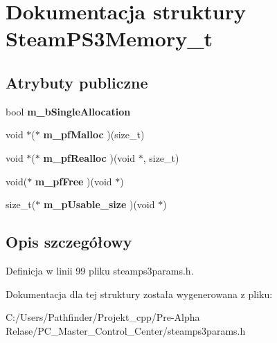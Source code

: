 \hypertarget{struct_steam_p_s3_memory__t}{}\section{Dokumentacja struktury Steam\+P\+S3\+Memory\+\_\+t}
\label{struct_steam_p_s3_memory__t}
\subsection*{Atrybuty publiczne}
\begin{DoxyCompactItemize}
\item 
\mbox{\label{struct_steam_p_s3_memory__t_a44b907c77800a95cbd721db75b0dbb55}} 
bool {\bfseries m\+\_\+b\+Single\+Allocation}
\item 
\mbox{\label{struct_steam_p_s3_memory__t_af1b7ebb45f7c058b9d45cc4aa1b21b13}} 
void $\ast$($\ast$ {\bfseries m\+\_\+pf\+Malloc} )(size\+\_\+t)
\item 
\mbox{\label{struct_steam_p_s3_memory__t_a0d84a4228b5424ffe007bec26faa0b94}} 
void $\ast$($\ast$ {\bfseries m\+\_\+pf\+Realloc} )(void $\ast$, size\+\_\+t)
\item 
\mbox{\label{struct_steam_p_s3_memory__t_a2a2933267637e0e85ccb09e1ae3ce93b}} 
void($\ast$ {\bfseries m\+\_\+pf\+Free} )(void $\ast$)
\item 
\mbox{\label{struct_steam_p_s3_memory__t_a0689a547d0e7370b902deb4c5ce68153}} 
size\+\_\+t($\ast$ {\bfseries m\+\_\+p\+Usable\+\_\+size} )(void $\ast$)
\end{DoxyCompactItemize}


\subsection{Opis szczegółowy}


Definicja w linii 99 pliku steamps3params.\+h.



Dokumentacja dla tej struktury została wygenerowana z pliku\+:\begin{DoxyCompactItemize}
\item 
C\+:/\+Users/\+Pathfinder/\+Projekt\+\_\+cpp/\+Pre-\/\+Alpha Relase/\+P\+C\+\_\+\+Master\+\_\+\+Control\+\_\+\+Center/steamps3params.\+h\end{DoxyCompactItemize}
